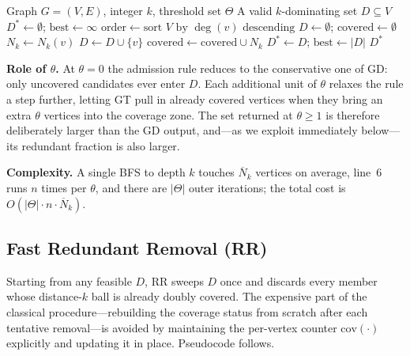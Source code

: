 \documentclass[11pt,a4paper]{article}
\newcommand{\Nk}{\overline{N}_k}
\newcommand{\cov}{\mathrm{cov}}
\begin{document}
\begin{algorithm}[ht]
\caption{GreedyTheta$(G, k, \Theta)$}
\label{alg:gt}
\begin{algorithmic}[1]
\Require Graph $G=(V,E)$, integer $k$, threshold set $\Theta$
\Ensure A valid $k$-dominating set $D\subseteq V$
\State $D^*\gets\emptyset$;\; $\text{best}\gets\infty$
\State $\text{order}\gets\text{sort } V \text{ by } \deg(v) \text{ descending}$
  \State $D\gets\emptyset$;\; $\text{covered}\gets\emptyset$
    \State $N_k\gets N_k(v)$ 
      \State $D\gets D\cup\{v\}$
      \State $\text{covered}\gets\text{covered}\cup N_k$
    \EndIf
  \EndFor
    \State $D^*\gets D$;\; $\text{best}\gets|D|$
  \EndIf
\EndFor
\State \Return $D^*$
\end{algorithmic}
\end{algorithm}

\textbf{Role of $\theta$.}
At $\theta=0$ the admission rule reduces to the conservative one of
GD: only uncovered candidates ever enter $D$. Each additional unit of
$\theta$ relaxes the rule a step further, letting GT pull in already
covered vertices when they bring an extra $\theta$ vertices into the
coverage zone. The set returned at $\theta\ge 1$ is therefore
deliberately larger than the GD output, and—as we exploit
immediately below—its redundant fraction is also larger.

\textbf{Complexity.} A single BFS to depth $k$ touches $\Nk$
vertices on average, line~6 runs $n$ times per $\theta$, and there
are $|\Theta|$ outer iterations; the total cost is
$O(|\Theta|\cdot n\cdot\Nk)$.

\subsection{Fast Redundant Removal (RR)}
\label{sec:rr}

Starting from any feasible $D$, RR sweeps $D$ once and discards every
member whose distance-$k$ ball is already doubly covered. The
expensive part of the classical procedure—rebuilding the coverage
status from scratch after each tentative removal—is avoided by
maintaining the per-vertex counter $\cov(\cdot)$ explicitly and
updating it in place. Pseudocode follows.
\end{document}
